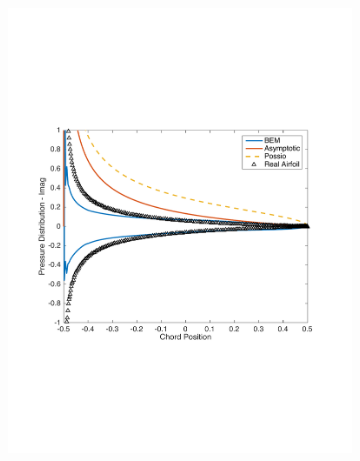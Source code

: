 \documentclass{article}
\begin{document}
\begin{figure}[h]
\begin{subfigure}{0.3\textwidth}
	\includegraphics[width = \textwidth, height=0.16\textheight]{NACA1101_pressure_k5imag}
\end{subfigure}%
\begin{subfigure}{0.33\textwidth}
	\centering

\end{subfigure}
\end{figure}
\end{document}
